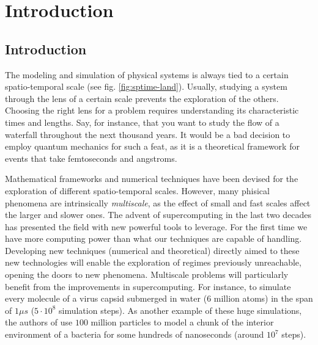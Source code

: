 \documentclass[ twoside,openright,titlepage,numbers=noenddot,%
headinclude,footinclude,cleardoublepage=empty,abstract=on,
BCOR=5mm,paper=a4,fontsize=11pt, dvipsnames
]{scrreprt}
\begin{document}
    \vspace{8ex}

    \printglossary[type=\acronymtype]
\endgroup
\glsresetall

\cleardoublepage
\pagestyle{scrheadings}
\cleardoublepage
\part{Introduction}\label{pt:intro}
\chapter{Introduction}\label{ch:introduction}

The modeling and simulation of physical systems is always tied to a certain spatio-temporal scale (see fig. \ref{fig:sptime-land}). Usually, studying a system through the lens of a certain scale prevents the exploration of the others.
Choosing the right lens for a problem requires understanding its characteristic times and lengths.
Say, for instance, that you want to study the flow of a waterfall throughout the next thousand years. It would be a bad decision to employ quantum mechanics for such a feat, as it is a theoretical framework for events that take femtoseconds and angstroms.

Mathematical frameworks and numerical techniques have been devised for the exploration of different spatio-temporal scales. However, many phisical phenomena are intrinsically \emph{multiscale}, as the effect of small and fast scales affect the larger and slower ones.
The advent of supercomputing in the last two decades has presented the field with new powerful tools to leverage. For the first time we have more computing power than what our techniques are capable of handling. 
Developing new techniques (numerical and theoretical) directly aimed to these new technologies will enable the exploration of regimes previously unreachable, opening the doors to new phenomena.
Multiscale problems will particularly benefit from the improvements in supercomputing.
For instance, \cite{Hadden2018} to simulate every molecule of a virus capsid submerged in water ($6$ million atoms) in the span of $1\mu s$ ($5\cdot10^8$ simulation steps).
As another example of these huge simulations, the authors of \cite{Rochaix2019} use $100$ million particles to model a chunk of the interior environment of a bacteria for some hundreds of nanoseconds (around $10^7$ steps).
\end{document}
